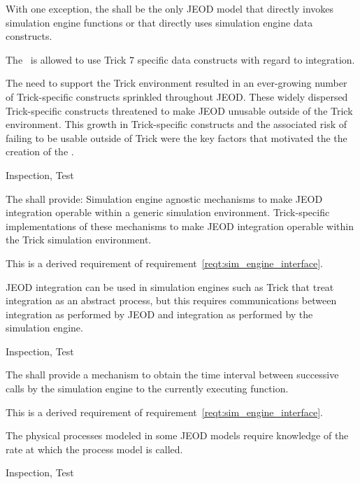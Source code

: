 \label{reqt:sim_engine_interface}
\begin{description:}
\item[Requirement]
  With one exception, the \ModelDesc shall be the only JEOD model that
  directly invokes simulation engine functions
  or that directly uses simulation engine data constructs.
\item[Exception]
  The \DYNMANAGER\ is allowed to use Trick 7 specific data constructs
  with regard to integration.
\item[Rationale]
  The need to support the Trick environment resulted in an ever-growing
  number of Trick-specific constructs sprinkled throughout JEOD.
  These widely dispersed Trick-specific constructs threatened to make JEOD
  unusable outside of the Trick environment.
  This growth in Trick-specific constructs and the associated risk of
  failing to be usable outside of Trick were the key factors that motivated
  the the creation of the \ModelDesc.
\item[Verification]
  Inspection, Test 
\end{description:}

\label{reqt:integ_interface}
\begin{description:}
\item[Requirement]
  The \ModelDesc shall provide:
   Simulation engine agnostic mechanisms to make
  JEOD integration operable within a generic simulation environment.
  Trick-specific implementations of these mechanisms to make
  JEOD integration operable within the Trick simulation environment.
\item[Rationale]
  This is a derived requirement of requirement~\ref{reqt:sim_engine_interface}.

  JEOD integration can be used in simulation engines such as Trick
  that treat integration as an abstract process, but this requires
  communications between integration as performed by JEOD and
  integration as performed by the simulation engine.
\item[Verification]
  Inspection, Test 
\end{description:}


\label{reqt:job_cycle}
\begin{description:}
\item[Requirement]
  The \ModelDesc shall provide a mechanism to obtain the time interval between
  successive calls by the simulation engine to the currently executing function.
\item[Rationale]
  This is a derived requirement of requirement~\ref{reqt:sim_engine_interface}.

  The physical processes modeled in some JEOD models require knowledge
  of the rate at which the process model is called.
\item[Verification]
  Inspection, Test 
\end{description:}


